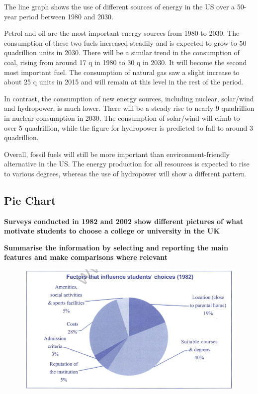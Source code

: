 \documentclass[conference]{IEEEtran}
\begin{document}
The line graph shows the use of different sources of energy in the US over a 50-year period between 1980 and 2030.

Petrol and oil are the most important energy sources from 1980 to 2030. 
The consumption of these two fuels increased steadily and is expected to grow to 50 quadrillion units in 2030. 
There will be a similar trend in the consumption of coal, rising from around 17 q in 1980 to 30 q in 2030. 
It will become the second most important fuel. 
The consumption of natural gas saw a slight increase to about 25 q units in 2015 and will remain at this level in the rest of the period.

In contrast, the consumption of new energy sources, including nuclear, solar/wind and hydropower, is much lower. 
There will be a steady rise to nearly 9 quadrillion in nuclear consumption in 2030.  
The consumption of solar/wind will climb to over 5 quadrillion, while the figure for hydropower is predicted to fall to around 3 quadrillion.

Overall, fossil fuels will still be more important than environment-friendly alternative in the US. 
The energy production for all resources is expected to rise to various degrees, whereas the use of hydropower will show a different pattern.

\subsection{Pie Chart}

\textbf{Surveys conducted in 1982 and 2002 show different pictures of what motivate students to choose a college or university in the UK}

\textbf{Summarise the information by selecting and reporting the main features and make comparisons where relevant}

\begin{figure}[htbp]
    \centerline{\includegraphics[width=1.0\columnwidth]{images/Screenshot from 2022-12-04 17-38-02.png}}
\end{figure}
\end{document}
